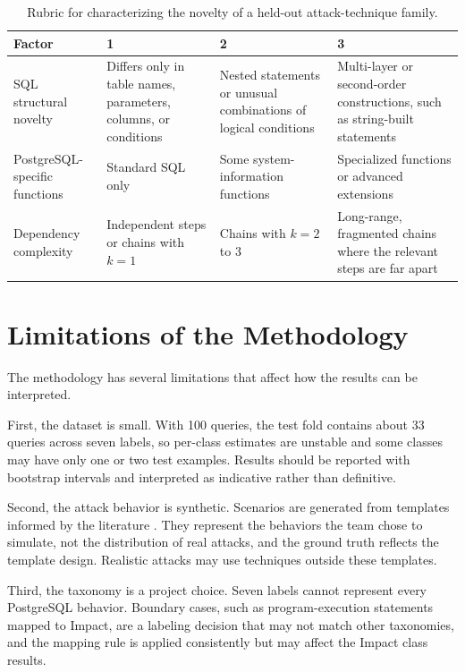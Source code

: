 \documentclass[12pt,a4paper]{report}
\begin{document}
\begin{table}[h]
\centering
\caption{Rubric for characterizing the novelty of a held-out attack-technique family.}
\label{tab:rubric}
\begin{tabular}{p{3.2cm} p{4.2cm} p{4.2cm} p{3.4cm}}
\hline
Factor & 1 & 2 & 3 \\
\hline
SQL structural novelty & Differs only in table names, parameters, columns, or conditions & Nested statements or unusual combinations of logical conditions & Multi-layer or second-order constructions, such as string-built statements \\
PostgreSQL-specific functions & Standard SQL only & Some system-information functions & Specialized functions or advanced extensions \\
Dependency complexity & Independent steps or chains with $k = 1$ & Chains with $k = 2$ to $3$ & Long-range, fragmented chains where the relevant steps are far apart \\
\hline
\end{tabular}
\end{table}

\section{Limitations of the Methodology}
\label{sec:limits}
The methodology has several limitations that affect how the results can be interpreted.

First, the dataset is small. With 100 queries, the test fold contains about 33 queries across seven labels, so per-class estimates are unstable and some classes may have only one or two test examples. Results should be reported with bootstrap intervals and interpreted as indicative rather than definitive.

Second, the attack behavior is synthetic. Scenarios are generated from templates informed by the literature \cite{song_decoy_2025,gomez-lopez_multi-agent_2026,landauer_cam-lds_2026}. They represent the behaviors the team chose to simulate, not the distribution of real attacks, and the ground truth reflects the template design. Realistic attacks may use techniques outside these templates.

Third, the taxonomy is a project choice. Seven labels cannot represent every PostgreSQL behavior. Boundary cases, such as program-execution statements mapped to Impact, are a labeling decision that may not match other taxonomies, and the mapping rule is applied consistently but may affect the Impact class results.
\end{document}
